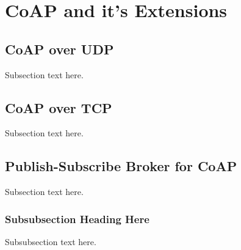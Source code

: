 \section{CoAP and it's Extensions}


\subsection{CoAP over UDP}
Subsection text here.

\subsection{CoAP over TCP}
Subsection text here.

\subsection{Publish-Subscribe Broker for CoAP}
Subsection text here.







\subsubsection{Subsubsection Heading Here}
Subsubsection text here.
